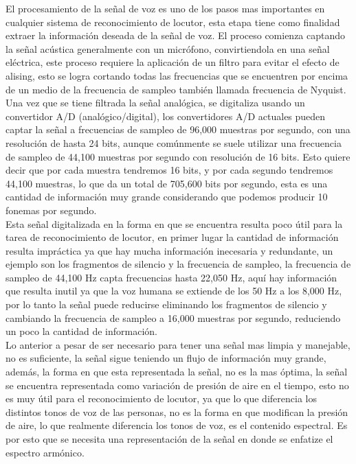 El procesamiento de la señal de voz es uno de los pasos mas importantes en cualquier sistema de reconocimiento de locutor,  esta etapa tiene como finalidad extraer la informaci\'on deseada de la señal de voz. El proceso comienza captando la señal ac\'ustica generalmente con un micr\'ofono, convirtiendola en una señal el\'ectrica, este proceso requiere la aplicaci\'on de un filtro para evitar el efecto de alising, esto se logra cortando todas las frecuencias que se encuentren por encima de un medio de la frecuencia de sampleo tambi\'en llamada frecuencia de Nyquist.\\

Una vez que se tiene filtrada la señal anal\'ogica, se digitaliza usando un convertidor A/D (anal\'ogico/digital), los convertidores A/D actuales pueden captar la señal a frecuencias de sampleo de 96,000 muestras por segundo, con una resoluci\'on de hasta 24 bits, aunque com\'unmente se suele utilizar una frecuencia de sampleo de 44,100 muestras por segundo con resoluci\'on de 16 bits. Esto quiere decir que por cada muestra tendremos 16 bits, y por cada segundo tendremos 44,100 muestras, lo que da un total de 705,600 bits por segundo, esta es una cantidad de informaci\'on muy grande considerando que podemos producir 10 fonemas por segundo.\\

Esta señal digitalizada en la forma en que se encuentra resulta poco \'util para la tarea de reconocimiento de locutor, en primer lugar la cantidad de informaci\'on resulta impr\'actica ya que hay mucha informaci\'on inecesaria y redundante, un ejemplo son los fragmentos de silencio y la frecuencia de sampleo, la frecuencia de sampleo de 44,100 Hz capta frecuencias hasta 22,050 Hz, aqu\'i hay informaci\'on  que resulta inutil ya que la voz humana se extiende de los 50 Hz a los 8,000 Hz, por lo tanto la señal puede reducirse eliminando los fragmentos de silencio y cambiando la frecuencia de sampleo a 16,000 muestras por segundo, reduciendo un poco la cantidad de informaci\'on.\\

Lo anterior a pesar de ser necesario para tener una señal mas limpia y manejable, no es suficiente, la señal sigue teniendo un flujo de informaci\'on muy grande, adem\'as, la forma en que esta representada la señal, no es la mas \'optima, la señal se encuentra representada como variaci\'on de presi\'on de aire en el tiempo, esto no es muy \'util para el reconocimiento de locutor, ya que lo que diferencia los distintos tonos de voz de las personas, no es la forma en que modifican la presi\'on de aire, lo que realmente diferencia los tonos de voz, es el contenido espectral. Es por esto que se necesita una representaci\'on de la señal en donde se enfatize el espectro arm\'onico.\\

